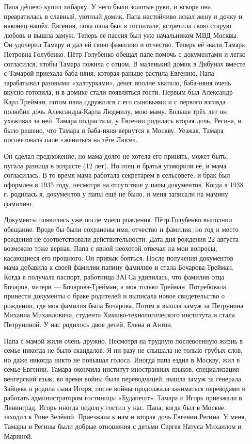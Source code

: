 {\sloppy

Папа дёшево купил хибарку.
У него были золотые руки, и вскоре она превратилась в славный, уютный домик.
Папа настойчиво искал жену и дочку и наконец нашёл.
Евгения, пока папа был в госпитале, встретила свою старую любовь и вышла замуж.
Теперь её пассия был уже начальником МВД Москвы.
Он удочерил Тамару и дал ей свою фамилию и отчество.
Теперь её звали Тамара Петровна Голубенко.
Пётр Голубенко обещал папе помочь с документами и легко согласился, чтобы Тамара пожила с отцом.
В маленький домик в Дибунах  вместе с Тамарой приехала баба-няня, которая раньше растила Евгению.
Папа зарабатывал разовыми «халтурками», денег вполне хватало, баба-няня очень вкусно готовила, и в домике стали появляться гости.
Первым был Александр-Карл Трейман, потом папа сдружился с его сыновьями и с первого взгляда полюбил дочь Александра-Карла Людмилу, мою маму.
Больше трёх лет он ухаживал за ней.
Тамара подрастала, у Евгении родилась вторая дочь, Регина, и было решено, что Тамара и баба-няня вернутся в Москву.
Уезжая, Тамара посоветовала папе «жениться на тёте Люсе».

}

Он сделал предложение, но мама долго не хотела его принять, может быть, пугала разница в возрасте (12 лет).
Но отец и братья уговорили её, и мама  согласилась.
В то время мама работала секретарём в сельсовете, и брак был оформлен в 1935 году, несмотря на отсутствие у папы документов.
Когда в 1938 г.
родилась я, документов у папы ещё не было, и меня записали на мамину фамилию.

Документы появились уже после моего рождения.
Пётр Голубенко выполнил обещание.
Вроде бы были сохранены имя, отчество и фамилия, но год и место рождения не соответствовали действительности.
Дата дня рождения 22 августа возможно тоже верная.
Папа с явной неохотой  отвечал на мои вопросы, касающиеся его прошлого.
Он привык бояться.
После получения документов мама добавила к своей фамилии папину фамилию и стала Бочарова-Трейман.
Когда я получала паспорт, работница ЗАГСа удивилась, что фамилия отца Бочаров, матери ---
Бочарова-Трейман, а моя только Трейман.
Потребовала принести документы о браке родителей и выписала новое свидетельство о рождении, где моя фамилия была Бочарова.
Потом я вышла замуж за Петрунина Михаила Михаиловича, студента Химико-технологического института и стала Петруниной.
У нас родилось двое детей, Елена и Антон.

Папа с мамой жили очень дружно.
Несмотря на трудную послевоенную жизнь в семье никогда не было скандалов.
Я ни разу не слышала не только грубых слов, но даже никогда никто не повышал голоса.
Иногда папа ездил в Москву, жил в семье Евгении.
Тамара окончила институт иностранных языков, специализация --- венгерский язык; во время войны была переводчицей, вышла замуж за генерала Зайцева  и родила сына Игоря, после войны продолжала заниматься переводами и работать администратором гостиницы «Будапешт».
Тамара и Игорь приезжали в Ленинград, Игорь иногда подолгу гостил у нас.
Папа, когда был в Москве, заходил к Рине Зелёной.
Приезжала к нам и вторая дочь Евгении Регина.
У меня, Тамары и Регины были добрые отношения с детьми Сергея Натуса Михаилом и Мариной.

